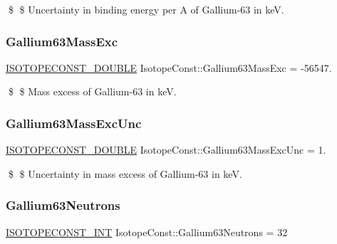 \$ \$ Uncertainty in binding energy per A of Gallium-\/63 in keV. \mbox{\label{group___isotope_const-_gallium-_ga63_ga1d6a2b11da2076dfeaf65ed1968bfe0d}} 
\subsubsection{\texorpdfstring{Gallium63\+Mass\+Exc}{Gallium63MassExc}}
{\footnotesize\ttfamily \mbox{\hyperlink{group___isotope_const-_macros_ga8f45a7272ce02c0b4c65c44636ed719a}{I\+S\+O\+T\+O\+P\+E\+C\+O\+N\+S\+T\+\_\+\+D\+O\+U\+B\+LE}} Isotope\+Const\+::\+Gallium63\+Mass\+Exc = -\/56547.}

\$ \$ Mass excess of Gallium-\/63 in keV. \mbox{\label{group___isotope_const-_gallium-_ga63_gaa95e74455c9451341d8012e3d1798048}} 
\subsubsection{\texorpdfstring{Gallium63\+Mass\+Exc\+Unc}{Gallium63MassExcUnc}}
{\footnotesize\ttfamily \mbox{\hyperlink{group___isotope_const-_macros_ga8f45a7272ce02c0b4c65c44636ed719a}{I\+S\+O\+T\+O\+P\+E\+C\+O\+N\+S\+T\+\_\+\+D\+O\+U\+B\+LE}} Isotope\+Const\+::\+Gallium63\+Mass\+Exc\+Unc = 1.}

\$ \$ Uncertainty in mass excess of Gallium-\/63 in keV. \mbox{\label{group___isotope_const-_gallium-_ga63_ga901d167e94ae3dd18fdffab6304d90bf}} 
\subsubsection{\texorpdfstring{Gallium63\+Neutrons}{Gallium63Neutrons}}
{\footnotesize\ttfamily \mbox{\hyperlink{group___isotope_const-_macros_ga5f18360b3e99483a35c32d789e62621c}{I\+S\+O\+T\+O\+P\+E\+C\+O\+N\+S\+T\+\_\+\+I\+NT}} Isotope\+Const\+::\+Gallium63\+Neutrons = 32}

